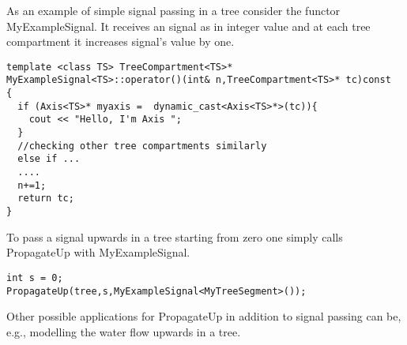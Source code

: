 As an example of simple signal passing in a  tree consider the functor
MyExampleSignal. It receives an signal as in integer value and at each
tree compartment it increases signal's value by one.

\begin{verbatim}
template <class TS> TreeCompartment<TS>* 
MyExampleSignal<TS>::operator()(int& n,TreeCompartment<TS>* tc)const
{
  if (Axis<TS>* myaxis =  dynamic_cast<Axis<TS>*>(tc)){
    cout << "Hello, I'm Axis ";
  }
  //checking other tree compartments similarly
  else if ...  
  ....
  n+=1;
  return tc; 
}
\end{verbatim}

To pass a signal upwards in a tree starting from zero one simply calls
PropagateUp with MyExampleSignal.

\begin{verbatim}
int s = 0;
PropagateUp(tree,s,MyExampleSignal<MyTreeSegment>());
\end{verbatim}

Other possible  applications for  PropagateUp   in addition to  signal
passing can be, e.g., modelling the water flow upwards in a tree.


